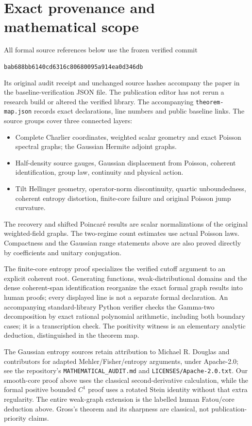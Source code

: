 \documentclass[11pt]{article}
\newcommand{\code}[1]{{\small\nolinkurl{#1}}}
\begin{document}
\section{Exact provenance and mathematical scope}
All formal source references below use the frozen verified commit
\begin{center}\code{bab688bb6140cd6316c80680095a914ea0d346db}\end{center}
Its original audit receipt and unchanged source hashes accompany the
paper in the baseline-verification JSON file. The publication editor
has not rerun a research build or altered the verified library.
The accompanying \code{theorem-map.json} records exact declarations,
line numbers and public baseline links. The source groups cover three connected layers:
\begin{itemize}
\item Complete Charlier coordinates, weighted scalar geometry and exact
Poisson spectral graphs; the Gaussian Hermite adjoint graphs.
\item Half-density source gauges, Gaussian displacement from Poisson,
coherent identification, group law, continuity and physical action.
\item Tilt Hellinger geometry, operator-norm discontinuity, quartic
unboundedness, coherent entropy distortion, finite-core failure and
original Poisson jump curvature.
\end{itemize}
The recovery and shifted Poincar\'e results are scalar normalizations of the original weighted-field graphs. The two-regime count estimates use actual Poisson laws. Compactness and the Gaussian range statements above are also proved directly by coefficients and unitary conjugation.

The finite-core entropy proof specializes the verified cutoff argument to
an explicit coherent root. Generating functions, weak-distributional
domains and the dense coherent-span identification reorganize the exact
formal graph results into human proofs; every displayed line is not a
separate formal declaration. An accompanying standard-library Python
verifier checks the Gamma-two decomposition by exact rational polynomial
arithmetic, including both boundary cases; it is a transcription check.
The positivity witness is an elementary
analytic deduction, distinguished in the theorem map.

The Gaussian entropy sources retain attribution to Michael R. Douglas
and contributors for adapted Mehler/Fisher/entropy arguments, under
Apache-2.0; see the repository's \code{MATHEMATICAL_AUDIT.md} and
\code{LICENSES/Apache-2.0.txt}. Our smooth-core proof above uses the
classical second-derivative calculation, while the formal positive
bounded $C^1$ proof uses a rotated Stein identity without that extra
regularity. The entire weak-graph extension is the labelled human
Fatou/core deduction above. Gross's theorem and its sharpness are
classical, not publication-priority claims.
\end{document}
